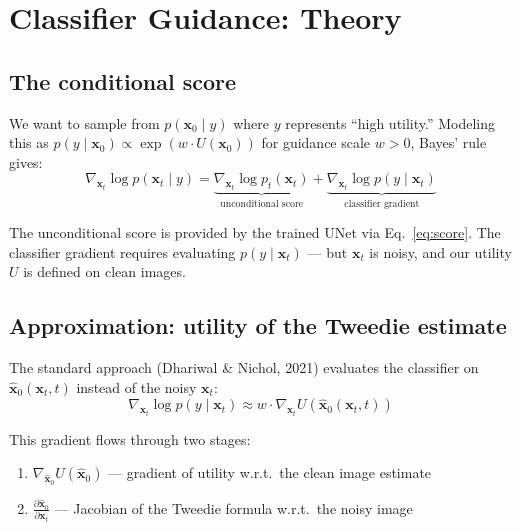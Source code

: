 \documentclass[11pt]{article}
\newcommand{\xb}{\mathbf{x}}
\begin{document}
\section{Classifier Guidance: Theory}
\label{sec:classifier_guidance}

\subsection{The conditional score}

We want to sample from $p(\xb_0 \mid y)$ where $y$ represents ``high utility.''
Modeling this as $p(y \mid \xb_0) \propto \exp(w \cdot U(\xb_0))$ for guidance scale $w > 0$,
Bayes' rule gives:
\begin{equation}
    \nabla_{\xb_t} \log p(\xb_t \mid y)
    = \underbrace{\nabla_{\xb_t} \log p_t(\xb_t)}_{\text{unconditional score}}
    + \underbrace{\nabla_{\xb_t} \log p(y \mid \xb_t)}_{\text{classifier gradient}}
    \label{eq:conditional_score}
\end{equation}

The unconditional score is provided by the trained UNet via Eq.~\eqref{eq:score}.
The classifier gradient requires evaluating $p(y \mid \xb_t)$ --- but $\xb_t$ is noisy,
and our utility $U$ is defined on clean images.

\subsection{Approximation: utility of the Tweedie estimate}

The standard approach (Dhariwal \& Nichol, 2021) evaluates the classifier on
$\hat{\xb}_0(\xb_t, t)$ instead of the noisy $\xb_t$:
\begin{equation}
    \nabla_{\xb_t} \log p(y \mid \xb_t)
    \approx w \cdot \nabla_{\xb_t} U\!\left(\hat{\xb}_0(\xb_t, t)\right)
    \label{eq:guidance_gradient}
\end{equation}

This gradient flows through two stages:
\begin{enumerate}[nosep]
    \item $\nabla_{\hat{\xb}_0} U(\hat{\xb}_0)$ --- gradient of utility w.r.t.\ the clean image estimate
    \item $\frac{\partial \hat{\xb}_0}{\partial \xb_t}$ --- Jacobian of the Tweedie formula w.r.t.\ the noisy image
\end{enumerate}
\end{document}
